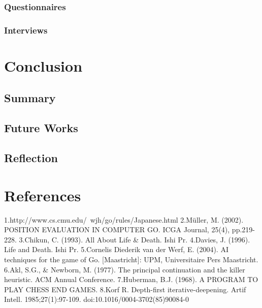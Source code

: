 \documentclass{l4proj}
\begin{document}
\subsection{Questionnaires}
\subsection{Interviews}






\chapter{Conclusion}

\section{Summary}

\section{Future Works}

\section{Reflection}


\chapter{References}
1.http://www.cs.cmu.edu/~wjh/go/rules/Japanese.html
2.Müller, M. (2002). POSITION EVALUATION IN COMPUTER GO. ICGA Journal, 25(4), pp.219-228.
3.Chikun, C. (1993). All About Life \& Death. Ishi Pr.
4.Davies, J. (1996). Life and Death. Ishi Pr.
5.Cornelis Diederik van der Werf, E. (2004). AI techniques for the game of Go. [Maastricht]: UPM, Universitaire Pers Maastricht.
6.Akl, S.G., \& Newborn, M. (1977). The principal continuation and the killer heuristic. ACM Annual Conference.
7.Huberman, B.J. (1968). A PROGRAM TO PLAY CHESS END GAMES.
8.Korf R. Depth-first iterative-deepening. Artif Intell. 1985;27(1):97-109. doi:10.1016/0004-3702(85)90084-0
\end{document}
